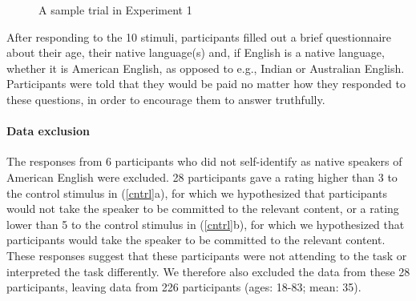 \documentclass[11pt,fleqn]{article}
\newcommand{\6}{\mbox{$[\hspace*{-.6mm}[$}}
\newcommand{\9}{\mbox{$]\hspace*{-.6mm}]$}}
\begin{document}
\begin{figure}[h!]
\begin{center}
\end{center}
\caption{A sample trial in Experiment 1}\label{f-corpus-trial}
\end{figure}

After responding to the 10 stimuli, 
participants filled out a brief questionnaire about their age, their
native language(s) and, if English is a native language, whether it is
American English, as opposed to e.g., Indian or Australian English.
Participants were told that they would be paid no matter how they
responded to these questions, in order to encourage them to answer
truthfully. 

\paragraph{Data exclusion} The responses from 6 participants who did not self-identify as native speakers of American English were excluded. 28 participants gave a rating higher than 3 to the control stimulus in (\ref{cntrl}a), for which we hypothesized that participants would not take the speaker to be committed to the relevant content, or a rating lower than 5 to the control stimulus in (\ref{cntrl}b), for which we hypothesized that participants would take the speaker to be committed to the relevant content. These responses suggest that these participants were not attending to the task or interpreted the task differently. We therefore also excluded the data from these 28 participants, leaving data from 226 participants (ages: 18-83; mean: 35).
\end{document}
